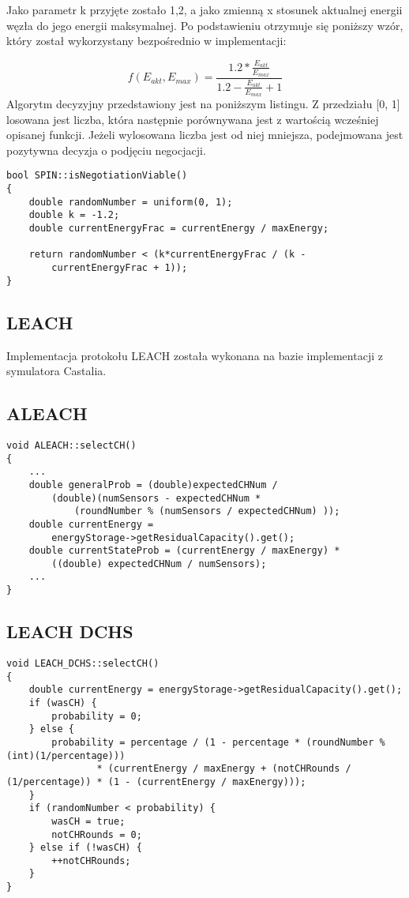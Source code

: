Jako parametr k przyjęte zostało 1,2, a jako zmienną x stosunek aktualnej energii węzła do jego energii maksymalnej. Po podstawieniu otrzymuje się poniższy wzór, który został wykorzystany bezpośrednio w implementacji: 

\[
	f(E_{akt}, E_{max}) = \frac{1.2 * \frac{E_{akt}}{E_{max}}}{1.2 - \frac{E_{akt}}{E_{max}} + 1}
\]
Algorytm decyzyjny przedstawiony jest na poniższym listingu. Z przedziału [0, 1] losowana jest liczba, która następnie porównywana jest z wartością wcześniej opisanej funkcji. Jeżeli wylosowana liczba jest od niej mniejsza, podejmowana jest pozytywna decyzja o podjęciu negocjacji.
\begin{verbatim}
bool SPIN::isNegotiationViable()
{
    double randomNumber = uniform(0, 1);
    double k = -1.2;
    double currentEnergyFrac = currentEnergy / maxEnergy;

    return randomNumber < (k*currentEnergyFrac / (k -
        currentEnergyFrac + 1));
}
\end{verbatim}
\subsection{LEACH}
Implementacja protokołu LEACH została wykonana na bazie implementacji z symulatora Castalia.
\subsection{ALEACH}
\begin{verbatim}
void ALEACH::selectCH()
{
    ...
    double generalProb = (double)expectedCHNum / 
        (double)(numSensors - expectedCHNum * 
            (roundNumber % (numSensors / expectedCHNum) ));
    double currentEnergy = 
        energyStorage->getResidualCapacity().get();
    double currentStateProb = (currentEnergy / maxEnergy) *
        ((double) expectedCHNum / numSensors);
    ...
}
\end{verbatim}
\subsection{LEACH DCHS}
\begin{verbatim}
void LEACH_DCHS::selectCH()
{
    double currentEnergy = energyStorage->getResidualCapacity().get();
    if (wasCH) {
        probability = 0;
    } else {
        probability = percentage / (1 - percentage * (roundNumber % (int)(1/percentage)))
                * (currentEnergy / maxEnergy + (notCHRounds / (1/percentage)) * (1 - (currentEnergy / maxEnergy)));
    }
    if (randomNumber < probability) {
        wasCH = true;
        notCHRounds = 0;
    } else if (!wasCH) {
        ++notCHRounds;
    }
}
\end{verbatim}
